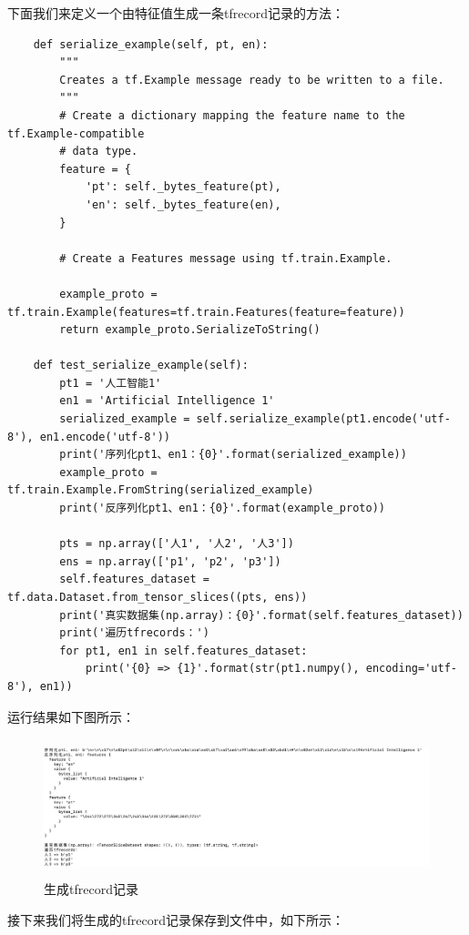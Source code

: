 \documentclass{article}
\begin{document}
下面我们来定义一个由特征值生成一条tfrecord记录的方法：
\begin{lstlisting}
    def serialize_example(self, pt, en):
        """
        Creates a tf.Example message ready to be written to a file.
        """
        # Create a dictionary mapping the feature name to the tf.Example-compatible
        # data type.
        feature = {
            'pt': self._bytes_feature(pt),
            'en': self._bytes_feature(en),
        }

        # Create a Features message using tf.train.Example.

        example_proto = tf.train.Example(features=tf.train.Features(feature=feature))
        return example_proto.SerializeToString()

    def test_serialize_example(self):
        pt1 = '人工智能1'
        en1 = 'Artificial Intelligence 1'
        serialized_example = self.serialize_example(pt1.encode('utf-8'), en1.encode('utf-8'))
        print('序列化pt1、en1：{0}'.format(serialized_example))
        example_proto = tf.train.Example.FromString(serialized_example)
        print('反序列化pt1、en1：{0}'.format(example_proto))

        pts = np.array(['人1', '人2', '人3'])
        ens = np.array(['p1', 'p2', 'p3'])
        self.features_dataset = tf.data.Dataset.from_tensor_slices((pts, ens))
        print('真实数据集(np.array)：{0}'.format(self.features_dataset))
        print('遍历tfrecords：')
        for pt1, en1 in self.features_dataset:
            print('{0} => {1}'.format(str(pt1.numpy(), encoding='utf-8'), en1))        
\end{lstlisting}
运行结果如下图所示：
\begin{figure}[H]
    \caption{生成tfrecord记录}
    \label{f000075}
    \centering
    \includegraphics[height=4cm]{images/f000075}
\end{figure}
接下来我们将生成的tfrecord记录保存到文件中，如下所示：
\end{document}
